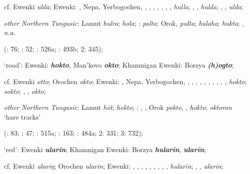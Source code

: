 \documentclass[output=paper,colorlinks,citecolor=brown]{langscibook}
\begin{document}
    cf.  Ewenki \textit{ulda};  Ewenki: , Nepa, Yerbogochen, , , , , , , ,  \textit{hulla}; , ,  \textit{hulda}; , ,  \textit{ulda};

    \textit{other Northern Tungusic}: Lamut \textit{hulra};  \textit{hola}; \textit{}:  \textit{polta}; Orok,  \textit{pulta};  \textit{hulaha};  \textit{hukta}; ,  \textit{n.a.}
    
    (\citealt{Castrén1856}: 76; \citealt{Janhunen1991}: 52; \citealt{Dorji1998}: 526a; \citealt{Vasilevic1958}: 493b; \citealt{Cincius1975B} 2: 345);

    \ex ‘road’:  Ewenki:  \textbf{\textit{hokto}}, Man’kovo \textbf{\textit{okto}}; Khamnigan Ewenki: Borzya \textbf{\textit{(h)ogto}};

    cf.  Ewenki \textit{otto}; Orochen \textit{okto};  Ewenki: , Nepa, Yerbogochen, , , , , , , , , , ,  \textit{hokto};  \textit{sokto}; , ,  \textit{okto};

    \textit{other Northern Tungusic}: Lamut \textit{hōt};  \textit{hokto}; \textit{}: , , Orok \textit{pokto}, ,  \textit{hokto};  \textit{oktoron} ‘hare tracks’
    
    (\citealt{Castrén1856}: 83; \citealt{Janhunen1991}: 47; \citealt{Dorji1998}: 515a; \citealt{Chaoke2014a}: 163; \citealt{Vasilevic1958}: 484a; \citealt{Cincius1975B} 2: 331; \citealt{Hauer1952} 3: 732); 

    \ex ‘red’:  Ewenki \textbf{\textit{ularin}}; Khamnigan Ewenki: Borzya \textbf{\textit{hularīn}},  \textbf{\textit{ularīn}};

    cf.  Ewenki \textit{ulariŋ}; Orochen \textit{ularin};  Ewenki: , , , , , , , , ,  \textit{hularīn}; , ,  \textit{ularin};
\end{document}
